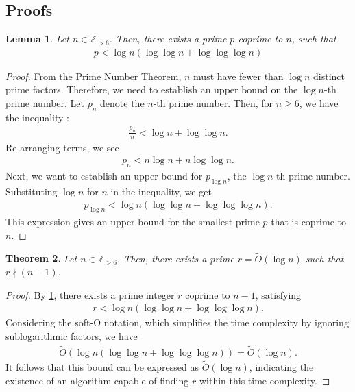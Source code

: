 \documentclass{article}
\theoremstyle{plain}
\newtheorem{theorem}{Theorem}[section]
\newtheorem{lemma}[theorem]{Lemma}
\theoremstyle{definition}
\newcommand{\Z}{\mathbb{Z}}
\begin{document}
\subsection{Proofs}
\begin{lemma} \label{proof:leastcoprime}
Let $n \in \Z_{>6}$. Then, there exists a prime $p$ coprime to $n$, such that
\begin{align*}
    p < \log n \left( \log\log n + \log\log\log n \right)
\end{align*}
\end{lemma}
\begin{proof}
From the Prime Number Theorem, $n$ must have fewer than $\log n$ distinct prime factors. Therefore, we need to establish an upper bound on the $\log n$-th prime number. Let $p_n$ denote the $n$-th prime number. Then, for $n \geq 6$, we have the inequality \cite{rosser1941primebounds}:
\begin{align*}
    \frac{p_n}{n} < \log n + \log\log n .
\end{align*}
Re-arranging terms, we see
\begin{align*}
    p_n < n \log n + n \log\log n .
\end{align*}
Next, we want to establish an upper bound for $p_{\log n}$, the $\log n$-th prime number. Substituting $\log n$ for $n$ in the inequality, we get
\begin{align*}
p_{\log n} < \log n \left( \log\log n + \log\log\log n \right) .
\end{align*}
This expression gives an upper bound for the smallest prime $p$ that is coprime to $n$.
\end{proof}
\begin{theorem} \label{proof:leastcoprimesofto}
Let $n \in \Z_{>6}$. Then, there exists a prime $r = \tilde{O}(\log n)$ such that $r \nmid (n-1)$.
\end{theorem}
\begin{proof}
By \cref{proof:leastcoprime}, there exists a prime integer $r$ coprime to $n-1$, satisfying
\begin{align*}
    r < \log n \left( \log\log n + \log\log\log n \right) .
\end{align*}
Considering the soft-O notation, which simplifies the time complexity by ignoring sublogarithmic factors, we have
\begin{align*}
    \tilde{O}(\log n \left( \log\log n + \log\log\log n \right)) = \tilde{O}(\log n).
\end{align*}
It follows that this bound can be expressed as $\tilde{O}(\log n)$, indicating the existence of an algorithm capable of finding $r$ within this time complexity.
\end{proof}
\end{document}

